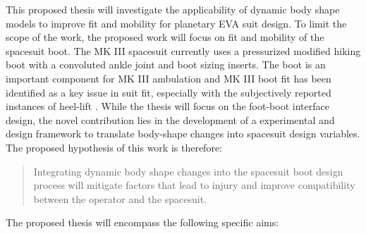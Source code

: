 \documentclass[defaultstyle,11pt]{comps}
\begin{document}
This proposed thesis will investigate the applicability of dynamic body shape models to improve fit and mobility for planetary EVA suit design.
To limit the scope of the work, the proposed work will focus on fit and mobility of the spacesuit boot.
The MK III spacesuit currently uses a pressurized modified hiking boot with a convoluted ankle joint and boot sizing inserts.
The boot is an important component for MK III ambulation and MK III boot fit has been identified as a key issue in suit fit, especially with the subjectively reported instances of heel-lift \citep{Fineman2018}.
While the thesis will focus on the foot-boot interface design, the novel contribution lies in the development of a experimental and design framework to translate body-shape changes into spacesuit design variables.
The proposed hypothesis of this work is therefore:

\begin{quote}
Integrating dynamic body shape changes into the spacesuit boot design process will mitigate factors that lead to injury and improve compatibility between the operator and the spacesuit.
\end{quote}

The proposed thesis will encompass the following specific aims:
\end{document}
